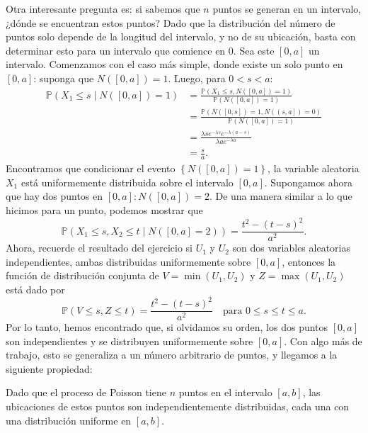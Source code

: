 	Otra interesante pregunta es: si sabemos que $n$ puntos se generan en un intervalo, ¿dónde se encuentran estos puntos? Dado que la distribución del número de puntos solo depende de la longitud del intervalo, y no de su ubicación, basta con determinar esto para un intervalo que comience en $0$. Sea este $\left[0,a\right]$ un intervalo. Comenzamos con el caso más simple, donde existe un solo punto en $\left[0,a\right]$: suponga que $N\left(\left[0,a\right]\right)=1$. Luego, para $0<s<a$:
	\begin{align*}
		\mathds{P}\left(X_{1}\le s\mid N\left(\left[0,a\right]\right)=1\right)
		&=\frac{\mathds{P}\left(X_{1}\le s,N\left(\left[0,a\right]\right)=1\right)}{\mathds{P}\left(N\left(\left[0,a\right]\right)=1\right)}\\
		&=\frac{\mathds{P}\left(N\left(\left[0,s\right]\right)=1,N\left(\left(s,a\right]\right)=0\right)}{\mathds{P}\left(N\left(\left[0,a\right]\right)=1\right)}\\
		&=\frac{\lambda se^{-\lambda s}e^{-\lambda\left(a-s\right)}}{\lambda ae^{-\lambda a}}\\
		&=\frac{s}{a}.
	\end{align*}
	Encontramos que condicionar el evento $\left\{N\left(\left[0,a\right]\right)=1\right\}$, la variable aleatoria $X_{1}$ está uniformemente distribuida sobre el intervalo $\left[0,a\right]$. Supongamos ahora que hay dos puntos en $\left[0,a\right]\colon N\left(\left[0,a\right]\right)=2$. De una manera similar a lo que hicimos para un punto, podemos mostrar que
	\[
		\mathds{P}\left(X_{1}\le s, X_{2}\le t\mid N\left(\left[0,a\right]=2\right)\right)=\frac{t^{2}-{\left(t-s\right)}^{2}}{a^{2}}.
	\]
	Ahora, recuerde el resultado del ejercicio%
	si $U_{1}$ y $U_{2}$ son dos variables aleatorias independientes, ambas distribuidas uniformemente sobre $\left[0,a\right]$, entonces la función de distribución conjunta de $V=\min\left(U_{1},U_{2}\right)$ y $Z=\max\left(U_{1},U_{2}\right)$ está dado por
	\[
		\mathds{P}\left(V\le s, Z\le t\right)=\frac{t^{2}-{\left(t-s\right)}^{2}}{a^{2}}\quad\text{para }0\le s\le t\le a.
	\]
	Por lo tanto, hemos encontrado que, si olvidamos su orden, los dos puntos $\left[0,a\right]$ son independientes y se distribuyen uniformemente sobre $\left[0,a\right]$. Con algo más de trabajo, esto se generaliza a un número arbitrario de puntos, y llegamos a la siguiente propiedad:
	\begin{definition}
		Dado que el proceso de Poisson tiene $n$ puntos en el intervalo $\left[a,b\right]$, las ubicaciones de estos puntos son independientemente distribuidas, cada una con una distribución uniforme en $\left[a,b\right]$.
	\end{definition}

